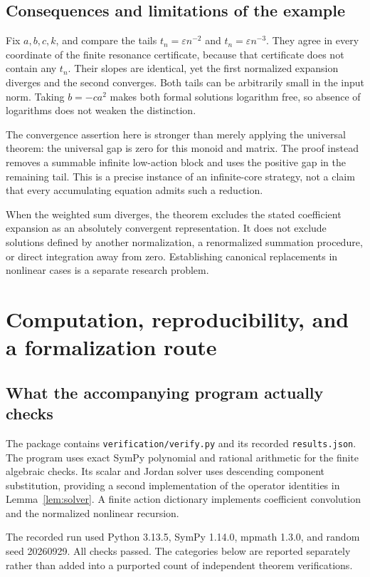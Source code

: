 \documentclass[11pt,a4paper]{article}
\numberwithin{equation}{section}
\theoremstyle{definition}
\theoremstyle{remark}
\begin{document}
\subsection{Consequences and limitations of the example}
Fix \(a,b,c,k\), and compare the tails
\(t_n=\varepsilon n^{-2}\) and \(t_n=\varepsilon n^{-3}\).
They agree in every coordinate of the finite resonance certificate,
because that certificate does not contain any \(t_n\).
Their slopes are identical, yet the first normalized expansion
diverges and the second converges. Both tails can be arbitrarily
small in the input norm. Taking \(b=-ca^2\) makes both formal
solutions logarithm free, so absence of logarithms does not weaken
the distinction.

The convergence assertion here is stronger than merely applying the
universal theorem: the universal gap is zero for this monoid and
matrix. The proof instead removes a summable infinite low-action
block and uses the positive gap in the remaining tail. This is a
precise instance of an infinite-core strategy, not a claim that every
accumulating equation admits such a reduction.

When the weighted sum diverges, the theorem excludes the stated
coefficient expansion as an absolutely convergent representation. It
does not exclude solutions defined by another normalization, a
renormalized summation procedure, or direct integration away from
zero. Establishing canonical replacements in nonlinear cases is a
separate research problem.

\section{Computation, reproducibility, and a formalization route}
\label{sec:verification}

\subsection{What the accompanying program actually checks}
The package contains \texttt{verification/verify.py} and its recorded
\texttt{results.json}. The program uses exact SymPy polynomial and
rational arithmetic for the finite algebraic checks. Its scalar and
Jordan solver uses descending component substitution, providing a
second implementation of the operator identities in
Lemma~\ref{lem:solver}. A finite action dictionary implements
coefficient convolution and the normalized nonlinear recursion.

The recorded run used Python 3.13.5, SymPy 1.14.0, mpmath 1.3.0, and
random seed 20260929. All checks passed. The categories below are
reported separately rather than added into a purported count of
independent theorem verifications.
\end{document}

